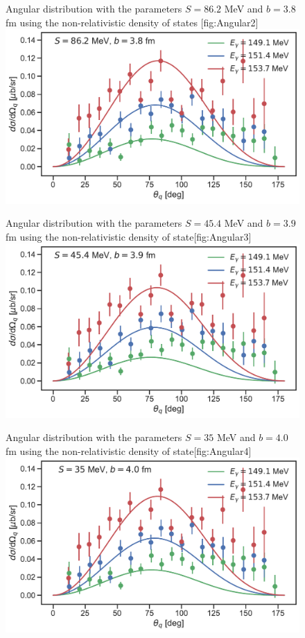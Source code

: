 \begin{figure}[H]
	\begin{sidecaption}{Angular distribution with the parameters $S=86.2$ MeV and $b=3.8$ fm using the non-relativistic density of states }[fig:Angular2]
		\includegraphics[width=\linewidth]{Figures/MultiDiffcross_nonrel_1.pdf}
	\end{sidecaption}
\end{figure}
\begin{figure}[H]
	\begin{sidecaption}{Angular distribution with the parameters $S=45.4$ MeV and $b=3.9$ fm using the non-relativistic density of state}[fig:Angular3]
		\includegraphics[width=\linewidth]{Figures/MultiDiffcross_nonrel_2.pdf}
	\end{sidecaption}
\end{figure}
\begin{figure}[H]
	\begin{sidecaption}{Angular distribution with the parameters $S=35$ MeV and $b=4.0$ fm using the non-relativistic density of state}[fig:Angular4]
		\includegraphics[width=\linewidth]{Figures/MultiDiffcross_nonrel_3.pdf}
	\end{sidecaption}
\end{figure}

